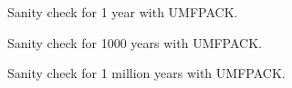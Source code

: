 \begin{figure}[!ht]
\centering
\resizebox{0.9\textwidth}{!}{}
\caption{Sanity check for 1 year with UMFPACK.}
\label{fig:nofission-pwru50-1-year-umfpack}
\end{figure}

\begin{figure}[!ht]
\centering
\resizebox{0.9\textwidth}{!}{}
\caption{Sanity check for 1000 years with UMFPACK.}
\label{fig:nofission-pwru50-1000-years-umfpack}
\end{figure}

\begin{figure}[!ht]
\centering
\resizebox{0.9\textwidth}{!}{}
\caption{Sanity check for 1 million years with UMFPACK.}
\label{fig:nofission-pwru50-1-million-years-umfpack}
\end{figure}
